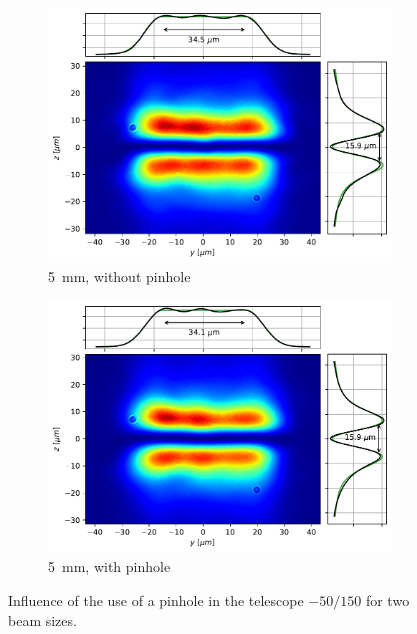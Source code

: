 \begin{figure}
    \vspace{0.3cm}
    \begin{subfigure}{0.45\textwidth}
        \includegraphics[width=\textwidth]{chapters/chapter_3/figures/small_nopin.pdf}
        \caption{\SI{5}{mm}, without pinhole}
    \end{subfigure}
    \hfill
    \begin{subfigure}{0.45\textwidth}
        \includegraphics[width=\textwidth]{chapters/chapter_3/figures/small_pin.pdf}
        \caption{\SI{5}{mm}, with pinhole}
    \end{subfigure}
    \caption{Influence of the use of a pinhole in the telescope $-50/150$ for two beam sizes.}
    \label{fig:pin}
\end{figure}


